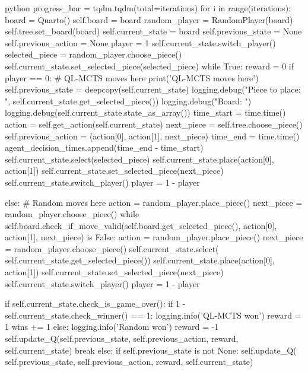 \begin{mintedbox}{python}
        progress_bar = tqdm.tqdm(total=iterations)
        for i in range(iterations):
            board = Quarto()
            self.board = board
            random_player = RandomPlayer(board)
            self.tree.set_board(board)
            self.current_state = board
            self.previous_state = None
            self.previous_action = None
            player = 1
            self.current_state.switch_player()
            selected_piece = random_player.choose_piece()
            self.current_state.set_selected_piece(selected_piece)
            while True:
                reward = 0
                if player == 0:
                    # QL-MCTS moves here
                    print('QL-MCTS moves here')
                    self.previous_state = deepcopy(self.current_state)
                    logging.debug("Piece to place: ",
                                    self.current_state.get_selected_piece())
                    logging.debug("Board: ")
                    logging.debug(self.current_state.state_as_array())
                    time_start = time.time()
                    action = self.get_action(self.current_state)
                    next_piece = self.tree.choose_piece()
                    self.previous_action = (action[0], action[1], next_piece)
                    time_end = time.time()
                    agent_decision_times.append(time_end - time_start)
                    self.current_state.select(selected_piece)
                    self.current_state.place(action[0], action[1])
                    self.current_state.set_selected_piece(next_piece)
                    self.current_state.switch_player()
                    player = 1 - player

                else:
                    # Random moves here
                    action = random_player.place_piece()
                    next_piece = random_player.choose_piece()
                    while self.board.check_if_move_valid(self.board.get_selected_piece(), action[0], action[1], next_piece) is False:
                        action = random_player.place_piece()
                        next_piece = random_player.choose_piece()
                    self.current_state.select(
                        self.current_state.get_selected_piece())
                    self.current_state.place(action[0], action[1])
                    self.current_state.set_selected_piece(next_piece)
                    self.current_state.switch_player()
                    player = 1 - player

                if self.current_state.check_is_game_over():
                    if 1 - self.current_state.check_winner() == 1:
                        logging.info('QL-MCTS won')
                        reward = 1
                        wins += 1
                    else:
                        logging.info('Random won')
                        reward = -1
                    self.update_Q(self.previous_state, self.previous_action,
                                    reward, self.current_state)
                    break
                else:
                    if self.previous_state is not None:
                        self.update_Q(
                            self.previous_state, self.previous_action, reward, self.current_state)


\end{mintedbox}
